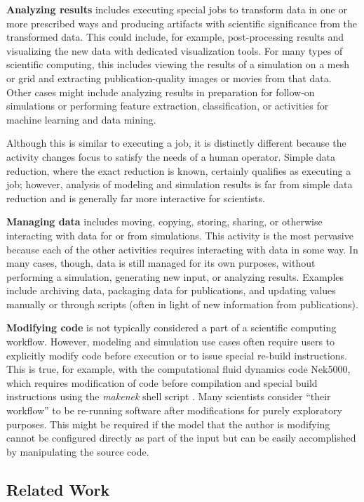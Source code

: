 \textbf{Analyzing results} includes executing special jobs to transform
data in one or more prescribed ways and producing artifacts with
scientific significance from the transformed data. This could include, for
example, post-processing results and visualizing the new data with
dedicated visualization tools. For many types of scientific computing,
this includes viewing the results of a simulation on a mesh or grid and
extracting publication-quality images or movies from that data. Other
cases might include analyzing results in preparation for follow-on
simulations or performing feature extraction, classification, or
activities for machine learning and data mining.

Although this is similar to executing a job, it is distinctly
different because the activity changes focus to satisfy the needs of a
human operator. Simple data reduction, where the exact reduction is
known, certainly qualifies as executing a job; however, analysis of
modeling and simulation results is far from simple data reduction and is
generally far more interactive for scientists.

\textbf{Managing data} includes moving, copying, storing, sharing, or
otherwise interacting with data for or from simulations. This activity
is the most pervasive because each of the other activities requires
interacting with data in some way. In many cases, though, data is still
managed for its own purposes, without performing a simulation,
generating new input, or analyzing results. Examples include archiving
data, packaging data for publications, and updating values manually or through scripts (often in light of new information from publications).

\textbf{Modifying code} is not typically considered a part of a
scientific computing workflow. However, modeling and simulation use
cases often require users to explicitly modify code before execution or to issue special re-build instructions. This is true, for example, with the computational fluid dynamics code Nek5000, which requires modification of code before compilation and special build instructions using the \textit{makenek} shell script
\cite{the_nek5000_team_nek5000_2014}.
Many scientists consider ``their workflow'' to be re-running
software after modifications for purely exploratory purposes. This might
be required if the model that the author is modifying cannot be
configured directly as part of the input but can be easily accomplished by manipulating the source code.

\subsection{Related Work}\label{comparison-to-other-models}

